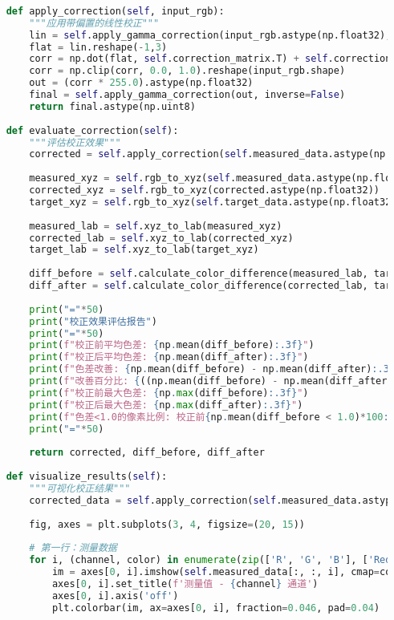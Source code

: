 \begin{lstlisting}[language=Python]
    
    def apply_correction(self, input_rgb):
        """应用带偏置的线性校正"""
        lin = self.apply_gamma_correction(input_rgb.astype(np.float32), inverse=True)/255.0
        flat = lin.reshape(-1,3)
        corr = np.dot(flat, self.correction_matrix.T) + self.correction_bias
        corr = np.clip(corr, 0.0, 1.0).reshape(input_rgb.shape)
        out = (corr * 255.0).astype(np.float32)
        final = self.apply_gamma_correction(out, inverse=False)
        return final.astype(np.uint8)
    
    def evaluate_correction(self):
        """评估校正效果"""
        corrected = self.apply_correction(self.measured_data.astype(np.float32))
        
        measured_xyz = self.rgb_to_xyz(self.measured_data.astype(np.float32))
        corrected_xyz = self.rgb_to_xyz(corrected.astype(np.float32))
        target_xyz = self.rgb_to_xyz(self.target_data.astype(np.float32))
        
        measured_lab = self.xyz_to_lab(measured_xyz)
        corrected_lab = self.xyz_to_lab(corrected_xyz)
        target_lab = self.xyz_to_lab(target_xyz)
        
        diff_before = self.calculate_color_difference(measured_lab, target_lab)
        diff_after = self.calculate_color_difference(corrected_lab, target_lab)
        
        print("="*50)
        print("校正效果评估报告")
        print("="*50)
        print(f"校正前平均色差: {np.mean(diff_before):.3f}")
        print(f"校正后平均色差: {np.mean(diff_after):.3f}")
        print(f"色差改善: {np.mean(diff_before) - np.mean(diff_after):.3f}")
        print(f"改善百分比: {((np.mean(diff_before) - np.mean(diff_after)) / np.mean(diff_before) * 100):.1f}%")
        print(f"校正前最大色差: {np.max(diff_before):.3f}")
        print(f"校正后最大色差: {np.max(diff_after):.3f}")
        print(f"色差<1.0的像素比例: 校正前{np.mean(diff_before < 1.0)*100:.1f}%, 校正后{np.mean(diff_after < 1.0)*100:.1f}%")
        print("="*50)
        
        return corrected, diff_before, diff_after
    
    def visualize_results(self):
        """可视化校正结果"""
        corrected_data = self.apply_correction(self.measured_data.astype(np.float32))
        
        fig, axes = plt.subplots(3, 4, figsize=(20, 15))
        
        # 第一行：测量数据
        for i, (channel, color) in enumerate(zip(['R', 'G', 'B'], ['Reds', 'Greens', 'Blues'])):
            im = axes[0, i].imshow(self.measured_data[:, :, i], cmap=color, vmin=0, vmax=255)
            axes[0, i].set_title(f'测量值 - {channel} 通道')
            axes[0, i].axis('off')
            plt.colorbar(im, ax=axes[0, i], fraction=0.046, pad=0.04)
        

\end{lstlisting}
